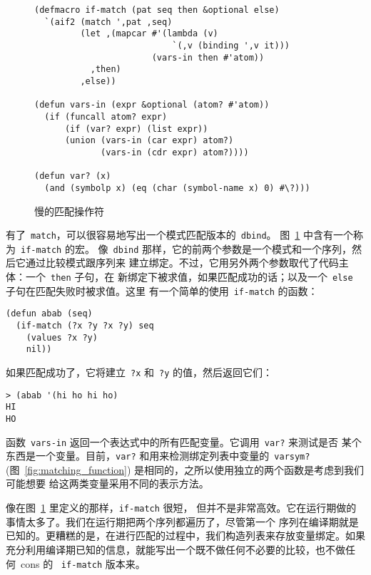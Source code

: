 \begin{figure}
\begin{lstlisting}
(defmacro if-match (pat seq then &optional else)
  `(aif2 (match ',pat ,seq)
         (let ,(mapcar #'(lambda (v)
                           `(,v (binding ',v it)))
                       (vars-in then #'atom))
           ,then)
         ,else))

(defun vars-in (expr &optional (atom? #'atom))
  (if (funcall atom? expr)
      (if (var? expr) (list expr))
      (union (vars-in (car expr) atom?)
             (vars-in (cdr expr) atom?))))

(defun var? (x)
  (and (symbolp x) (eq (char (symbol-name x) 0) #\?)))
\end{lstlisting}
  \caption{慢的匹配操作符}
  \label{fig:slow_matching_operator}
\end{figure}

有了~\texttt{match}，可以很容易地写出一个模式匹配版本的~\texttt{dbind}。
图~\ref{fig:slow_matching_operator} 中含有一个称为~\texttt{if-match} 的宏。
像~\texttt{dbind} 那样，它的前两个参数是一个模式和一个序列，然后它通过比较模式跟序列来
建立绑定。不过，它用另外两个参数取代了代码主体：一个~\texttt{then} 子句，在
新绑定下被求值，如果匹配成功的话；以及一个~\texttt{else} 子句在匹配失败时被求值。这里
有一个简单的使用~\texttt{if-match} 的函数：
\begin{lstlisting}
(defun abab (seq)
  (if-match (?x ?y ?x ?y) seq
    (values ?x ?y)
    nil))
\end{lstlisting}
如果匹配成功了，它将建立~\texttt{?x} 和~\texttt{?y} 的值，然后返回它们：
\begin{lstlisting}
> (abab '(hi ho hi ho)
HI
HO
\end{lstlisting}

函数~\texttt{vars-in} 返回一个表达式中的所有匹配变量。它调用~\texttt{var?} 来测试是否
某个东西是一个变量。目前，\texttt{var?} 和用来检测绑定列表中变量的~\texttt{varsym?}
(图~\ref{fig:matching_function}) 是相同的，之所以使用独立的两个函数是考虑到我们可能想要
给这两类变量采用不同的表示方法。

像在图~\ref{fig:slow_matching_operator} 里定义的那样，\texttt{if-match} 很短，
但并不是非常高效。它在运行期做的事情太多了。我们在运行期把两个序列都遍历了，尽管第一个
序列在编译期就是已知的。更糟糕的是，在进行匹配的过程中，我们构造列表来存放变量绑定。如果
充分利用编译期已知的信息，就能写出一个既不做任何不必要的比较，也不做任何~cons 的
~\texttt{if-match} 版本来。

